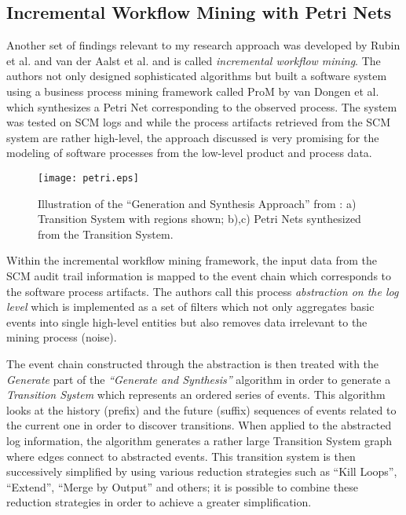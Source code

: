 \subsection{Incremental Workflow Mining with Petri Nets}
Another set of findings relevant to my research approach was developed by Rubin
et al. \cite{citeulike:1885717} and van der Aalst et al.
\cite{citeulike:3718014} and is called \textit{incremental workflow mining}. The
authors not only designed sophisticated algorithms but built a software system
using a business process mining framework called ProM by van Dongen et al.
\cite{citeulike:5043673} which synthesizes a Petri Net corresponding to the
observed process. The system was tested on SCM logs and while the process
artifacts retrieved from the SCM system are rather high-level, the approach
discussed is very promising for the modeling of software processes from the
low-level product and process data.

\begin{figure}[tbp]
   \centering
   \texttt{[image: petri.eps]}
   \caption{Illustration of the ``Generation and Synthesis Approach'' from
\cite{citeulike:5043673}: a) Transition System with regions shown; b),c) Petri
Nets synthesized from the Transition System.}
   \label{fig:petri}
\end{figure}

Within the incremental workflow mining framework, the input data from the SCM
audit trail information is mapped to the event chain which corresponds to the
software process artifacts. The authors call this process \textit{abstraction on
the log level} which is implemented as a set of filters which not only
aggregates basic events into single high-level entities but also removes data
irrelevant to the mining process (noise). 

The event chain constructed through the abstraction is then treated with the
\textit{Generate} part of the \textit{``Generate and Synthesis''}
\cite{citeulike:3718014} algorithm in order to generate a \textit{Transition
System} which represents an ordered series of events. This algorithm looks at
the history (prefix) and the future (suffix) sequences of events related to the
current one in order to discover transitions.  When applied to the abstracted
log information, the algorithm generates a rather large Transition System graph
where edges connect to abstracted events. This transition system is then
successively simplified by using various reduction strategies such as ``Kill
Loops'', ``Extend'', ``Merge by Output'' and others; it is possible to combine
these reduction strategies in order to achieve a greater simplification.

